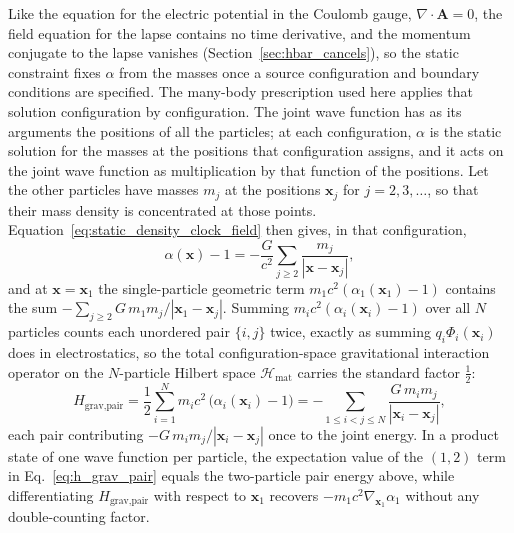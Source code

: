 \documentclass[aps,prd,onecolumn,tightenlines,nofootinbib,notitlepage,11pt,floatfix]{revtex4-2}
\theoremstyle{indentedtheorem}
\begin{document}
Like the equation for the electric potential in the Coulomb gauge, $\nabla\cdot\mathbf{A}=0$, the field equation for the lapse contains no time derivative, and the momentum conjugate to the lapse vanishes (Section~\ref{sec:hbar_cancels}), so the static constraint fixes $\alpha$ from the masses once a source configuration and boundary conditions are specified. The many-body prescription used here applies that solution configuration by configuration. The joint wave function has as its arguments the positions of all the particles; at each configuration, $\alpha$ is the static solution for the masses at the positions that configuration assigns, and it acts on the joint wave function as multiplication by that function of the positions. Let the other particles have masses $m_j$ at the positions $\mathbf{x}_j$ for $j=2,3,\ldots$, so that their mass density is concentrated at those points. Equation~\eqref{eq:static_density_clock_field} then gives, in that configuration,
\begin{equation}
    \alpha(\mathbf{x}) - 1 = -\frac{G}{c^2}\sum_{j\geq2}\frac{m_j}{|\mathbf{x}-\mathbf{x}_j|} ,
    \label{eq:alpha_configuration}
\end{equation}
and at $\mathbf{x}=\mathbf{x}_1$ the single-particle geometric term $m_1c^2(\alpha_1(\mathbf{x}_1)-1)$ contains the sum $-\sum_{j\geq2}G\,m_1m_j/|\mathbf{x}_1-\mathbf{x}_j|$. Summing $m_i c^2(\alpha_i(\mathbf{x}_i)-1)$ over all $N$ particles counts each unordered pair $\{i,j\}$ twice, exactly as summing $q_i\Phi_i(\mathbf{x}_i)$ does in electrostatics, so the total configuration-space gravitational interaction operator on the $N$-particle Hilbert space $\mathcal{H}_\text{mat}$ carries the standard factor $\tfrac{1}{2}$:
\begin{equation}
    H_\text{grav,pair} = \frac{1}{2}\sum_{i=1}^{N} m_i c^2\,\big(\alpha_i(\mathbf{x}_i)-1\big) = -\sum_{1\le i<j\le N}\frac{G\,m_i m_j}{|\mathbf{x}_i-\mathbf{x}_j|} ,
    \label{eq:h_grav_pair}
\end{equation}
each pair contributing $-G\,m_i m_j/|\mathbf{x}_i-\mathbf{x}_j|$ once to the joint energy. In a product state of one wave function per particle, the expectation value of the $(1,2)$ term in Eq.~\eqref{eq:h_grav_pair} equals the two-particle pair energy above, while differentiating $H_\text{grav,pair}$ with respect to $\mathbf{x}_1$ recovers $-m_1c^2\nabla_{\mathbf{x}_1}\alpha_1$ without any double-counting factor.
\end{document}
